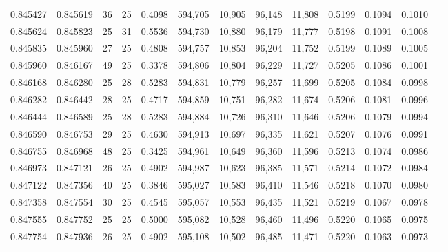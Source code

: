 \begin{tabular}{rrrrrrrrrrrrr}
0.845427 & 0.845619 &    36 &  25 &                                     0.4098 & 594,705 &  10,905 &  96,148 &  11,808 & 0.5199 & 0.1094 & 0.1010 \\
0.845624 & 0.845823 &    25 &  31 &                                     0.5536 & 594,730 &  10,880 &  96,179 &  11,777 & 0.5198 & 0.1091 & 0.1008 \\
0.845835 & 0.845960 &    27 &  25 &                                     0.4808 & 594,757 &  10,853 &  96,204 &  11,752 & 0.5199 & 0.1089 & 0.1005 \\
0.845960 & 0.846167 &    49 &  25 &                                     0.3378 & 594,806 &  10,804 &  96,229 &  11,727 & 0.5205 & 0.1086 & 0.1001 \\
0.846168 & 0.846280 &    25 &  28 &                                     0.5283 & 594,831 &  10,779 &  96,257 &  11,699 & 0.5205 & 0.1084 & 0.0998 \\
0.846282 & 0.846442 &    28 &  25 &                                     0.4717 & 594,859 &  10,751 &  96,282 &  11,674 & 0.5206 & 0.1081 & 0.0996 \\
0.846444 & 0.846589 &    25 &  28 &                                     0.5283 & 594,884 &  10,726 &  96,310 &  11,646 & 0.5206 & 0.1079 & 0.0994 \\
0.846590 & 0.846753 &    29 &  25 &                                     0.4630 & 594,913 &  10,697 &  96,335 &  11,621 & 0.5207 & 0.1076 & 0.0991 \\
0.846755 & 0.846968 &    48 &  25 &                                     0.3425 & 594,961 &  10,649 &  96,360 &  11,596 & 0.5213 & 0.1074 & 0.0986 \\
0.846973 & 0.847121 &    26 &  25 &                                     0.4902 & 594,987 &  10,623 &  96,385 &  11,571 & 0.5214 & 0.1072 & 0.0984 \\
0.847122 & 0.847356 &    40 &  25 &                                     0.3846 & 595,027 &  10,583 &  96,410 &  11,546 & 0.5218 & 0.1070 & 0.0980 \\
0.847358 & 0.847554 &    30 &  25 &                                     0.4545 & 595,057 &  10,553 &  96,435 &  11,521 & 0.5219 & 0.1067 & 0.0978 \\
0.847555 & 0.847752 &    25 &  25 &                                     0.5000 & 595,082 &  10,528 &  96,460 &  11,496 & 0.5220 & 0.1065 & 0.0975 \\
0.847754 & 0.847936 &    26 &  25 &                                     0.4902 & 595,108 &  10,502 &  96,485 &  11,471 & 0.5220 & 0.1063 & 0.0973 \\

\end{tabular}
